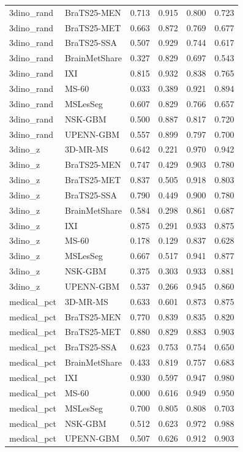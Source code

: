 \begin{tabular}{llrrrr}
3dino\_rand & BraTS25-MEN & 0.713 & 0.915 & 0.800 & 0.723 \\
3dino\_rand & BraTS25-MET & 0.663 & 0.872 & 0.769 & 0.677 \\
3dino\_rand & BraTS25-SSA & 0.507 & 0.929 & 0.744 & 0.617 \\
3dino\_rand & BrainMetShare & 0.327 & 0.829 & 0.697 & 0.543 \\
3dino\_rand & IXI & 0.815 & 0.932 & 0.838 & 0.765 \\
3dino\_rand & MS-60 & 0.033 & 0.389 & 0.921 & 0.894 \\
3dino\_rand & MSLesSeg & 0.607 & 0.829 & 0.766 & 0.657 \\
3dino\_rand & NSK-GBM & 0.500 & 0.887 & 0.817 & 0.720 \\
3dino\_rand & UPENN-GBM & 0.557 & 0.899 & 0.797 & 0.700 \\
3dino\_z & 3D-MR-MS & 0.642 & 0.221 & 0.970 & 0.942 \\
3dino\_z & BraTS25-MEN & 0.747 & 0.429 & 0.903 & 0.780 \\
3dino\_z & BraTS25-MET & 0.837 & 0.505 & 0.918 & 0.803 \\
3dino\_z & BraTS25-SSA & 0.790 & 0.449 & 0.900 & 0.780 \\
3dino\_z & BrainMetShare & 0.584 & 0.298 & 0.861 & 0.687 \\
3dino\_z & IXI & 0.875 & 0.291 & 0.933 & 0.875 \\
3dino\_z & MS-60 & 0.178 & 0.129 & 0.837 & 0.628 \\
3dino\_z & MSLesSeg & 0.667 & 0.517 & 0.941 & 0.877 \\
3dino\_z & NSK-GBM & 0.375 & 0.303 & 0.933 & 0.881 \\
3dino\_z & UPENN-GBM & 0.537 & 0.266 & 0.945 & 0.860 \\
medical\_pct & 3D-MR-MS & 0.633 & 0.601 & 0.873 & 0.875 \\
medical\_pct & BraTS25-MEN & 0.770 & 0.839 & 0.835 & 0.820 \\
medical\_pct & BraTS25-MET & 0.880 & 0.829 & 0.883 & 0.903 \\
medical\_pct & BraTS25-SSA & 0.623 & 0.753 & 0.754 & 0.650 \\
medical\_pct & BrainMetShare & 0.433 & 0.819 & 0.757 & 0.683 \\
medical\_pct & IXI & 0.930 & 0.597 & 0.947 & 0.980 \\
medical\_pct & MS-60 & 0.000 & 0.616 & 0.949 & 0.950 \\
medical\_pct & MSLesSeg & 0.700 & 0.805 & 0.808 & 0.703 \\
medical\_pct & NSK-GBM & 0.512 & 0.623 & 0.972 & 0.988 \\
medical\_pct & UPENN-GBM & 0.507 & 0.626 & 0.912 & 0.903 \\
\bottomrule
\end{tabular}
